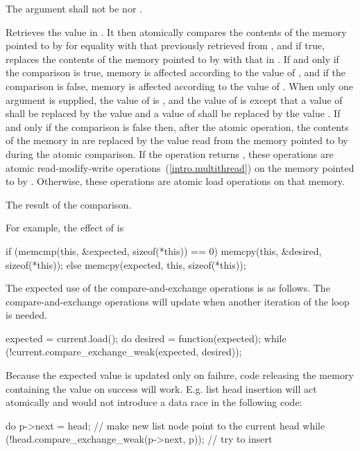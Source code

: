 \begin{itemdescr}
\pnum
\requires The  argument shall not be  nor
.

\pnum
\effects Retrieves the value in . It then atomically
compares the contents of the memory pointed to by 
for equality with that previously retrieved from ,
and if true, replaces the contents of the memory pointed to
by  with that in .
If and only if the comparison is true, memory is affected according to the
value of , and if the comparison is false, memory is affected according
to the value of . When only one  argument is
supplied, the value of  is , and the value of
 is  except that a value of 
shall be replaced by the value  and a value of
 shall be replaced by the value
.
If and only if the comparison is false then, after the atomic operation,
the contents of the memory in  are replaced by the value
read from the memory pointed to by  during the atomic comparison.
If the operation returns , these
operations are atomic read-modify-write
operations~(\ref{intro.multithread}) on the memory
pointed to by .
Otherwise, these operations are atomic load operations on that memory.

\pnum
\returns The result of the comparison.

\pnum
\begin{note} For example, the effect of
 is
\begin{codeblock}
if (memcmp(this, &expected, sizeof(*this)) == 0)
  memcpy(this, &desired, sizeof(*this));
else
  memcpy(expected, this, sizeof(*this));
\end{codeblock}
\end{note}
\begin{example} The expected use of the compare-and-exchange operations is as follows. The
compare-and-exchange operations will update  when another iteration of
the loop is needed.
\begin{codeblock}
expected = current.load();
do {
  desired = function(expected);
} while (!current.compare_exchange_weak(expected, desired));
\end{codeblock}
\end{example}
\begin{example} Because the expected value is updated only on failure,
code releasing the memory containing the  value on success will work.
E.g. list head insertion will act atomically and would not introduce a
data race in the following code:
\begin{codeblock}
do {
  p->next = head; // make new list node point to the current head
} while (!head.compare_exchange_weak(p->next, p)); // try to insert
\end{codeblock}
\end{example}


\end{itemdescr}
